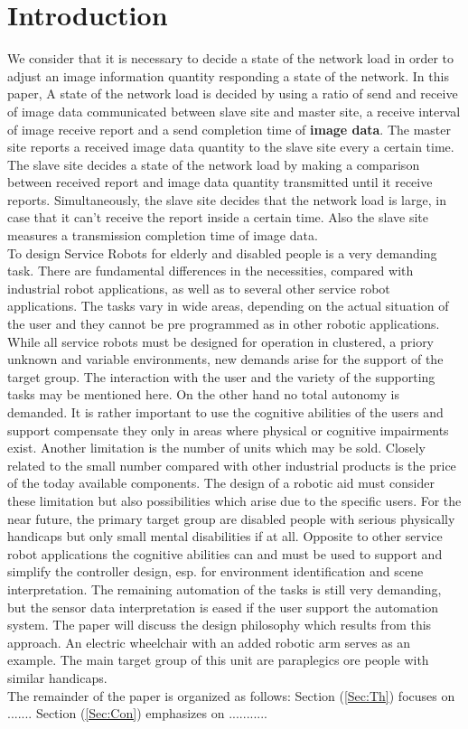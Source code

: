 \section{Introduction}
\label{Sec:int}
We consider that it is necessary to decide a state of the network load in order to adjust an image information quantity responding a state of the network.  In this paper, A state of the network load is decided by using a ratio of send and receive of image data communicated between slave site and master site, a receive interval of image receive report and a send completion time of \textbf{image data}.  The master site reports a received image data quantity to the slave site every a certain time.  The slave site decides a state of the network load by making a comparison between received report and image data quantity transmitted until it receive reports.  Simultaneously, the slave site decides that the network load is large, in case that it can't receive the report inside a certain time.  Also the slave site measures a transmission completion time of image data.\\

To design Service Robots for elderly and disabled people is a very demanding task. There are fundamental differences in the necessities, compared with industrial robot applications, as well as to several other service robot applications. The tasks vary in wide areas, depending on the actual situation of the user and they cannot be pre programmed as in other robotic applications. While all service robots must be designed for operation in clustered, a priory unknown and variable environments, new demands arise for the support of the target group. The interaction with the user and the variety of the supporting tasks may be mentioned here. On the other hand no total autonomy is demanded. It is rather important to use the cognitive abilities of the users and support compensate they only in areas where physical or cognitive impairments exist. Another limitation is the number of units which may be sold. Closely related to the small number compared with other industrial products is the price of the today available components. The design of a robotic aid must consider these limitation but also possibilities which arise due to the specific users. For the near future, the primary target group are disabled people with serious physically handicaps but only small mental disabilities if at all. Opposite to other service robot applications the cognitive abilities can and must be used to support and simplify the controller design, esp. for environment identification and scene interpretation. The remaining automation of the tasks is still very demanding, but the sensor data interpretation is eased if the user support the automation system. The paper will discuss the design philosophy which results from this approach. An electric wheelchair with an added robotic arm serves as an example. The main target group of this unit are paraplegics ore people with similar handicaps. \\

The remainder of the paper is organized as follows: Section (\ref{Sec:Th}) focuses on ....... Section (\ref{Sec:Con}) emphasizes on ...........
